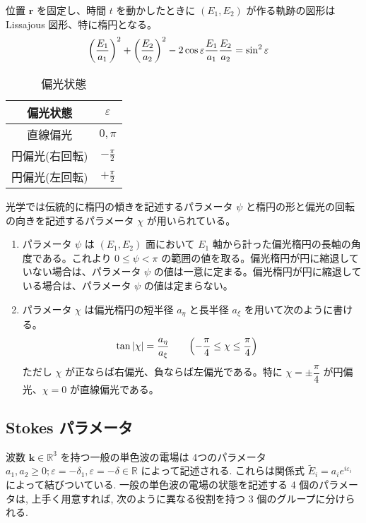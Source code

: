 \documentclass[uplatex,dvipdfmx,a4paper,11pt]{jlreq}
\newcommand{\RR}{\mathbb{R}}
\newcommand{\rr}{\bm{r}}
\newcommand{\kk}{\bm{k}}
\theoremstyle{definition}
\begin{document}
\begin{proposition}
  位置 $\rr$ を固定し、時間 $t$ を動かしたときに $(E_1, E_2)$ が作る軌跡の図形は Lissajous 図形、特に楕円となる。
  \begin{align}
    \qty(\frac{E_1}{a_1})^2 + \qty(\frac{E_2}{a_2})^2 - 2\cos\varepsilon\frac{E_1}{a_1}\frac{E_2}{a_2} & = \sin^2{\varepsilon}
  \end{align}
\end{proposition}

\begin{table}[hbtp]
  \centering
  \begin{tabular}{|c|c|}
    \hline
    偏光状態     & $\varepsilon$    \\
    \hline \hline
    直線偏光     & $0, \pi$         \\
    円偏光(右回転) & $-\frac{\pi}{2}$ \\
    円偏光(左回転) & $+\frac{\pi}{2}$ \\
    \hline
  \end{tabular}
  \caption{偏光状態}
\end{table}

\begin{definition}
  光学では伝統的に楕円の傾きを記述するパラメータ $\psi$ と楕円の形と偏光の回転の向きを記述するパラメータ $\chi$ が用いられている。
  \begin{enumerate}
    \item パラメータ $\psi$ は $(E_1, E_2)$ 面において $E_1$ 軸から計った偏光楕円の長軸の角度である。これより $0 \leq \psi < \pi$ の範囲の値を取る。偏光楕円が円に縮退していない場合は、パラメータ $\psi$ の値は一意に定まる。偏光楕円が円に縮退している場合は、パラメータ $\psi$ の値は定まらない。
    \item パラメータ $\chi$ は偏光楕円の短半径 $a_\eta$ と長半径 $a_\xi$ を用いて次のように書ける。
          \begin{align}
            \tan|\chi| & = \frac{a_\eta}{a_\xi} \qquad \qty(-\frac{\pi}{4}\leq\chi\leq\frac{\pi}{4})
          \end{align}
          ただし $\chi$ が正ならば右偏光、負ならば左偏光である。特に $\chi = \pm\dfrac{\pi}{4}$ が円偏光、$\chi = 0$ が直線偏光である。
  \end{enumerate}
\end{definition}
\subsection{Stokes パラメータ}
波数 $\kk\in\RR^3$ を持つ一般の単色波の電場は 4つのパラメータ $a_1, a_2 \geq 0; \varepsilon = -\delta_1, \varepsilon = -\delta\in\RR$ によって記述される. これらは関係式 $\tilde{E}_i = a_ie^{i \varepsilon_i}$ によって結びついている. 一般の単色波の電場の状態を記述する 4 個のパラメータは, 上手く用意すれば, 次のように異なる役割を持つ 3 個のグループに分けられる.
\end{document}
